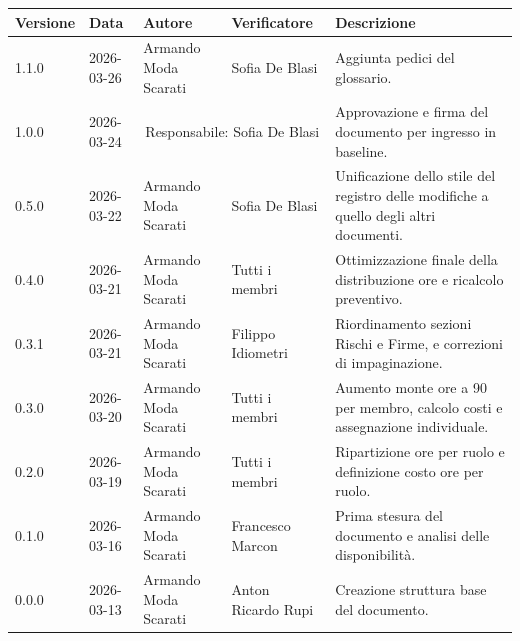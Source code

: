\documentclass[11pt, a4paper]{article}
\begin{document}
	\renewcommand{\arraystretch}{1.5}
	\begin{longtable}{>{\ttfamily\small}l l l l >{\raggedright\arraybackslash}p{5cm}}
		\toprule
		\textbf{Versione} & \textbf{Data} & \textbf{Autore} & \textbf{Verificatore} & \textbf{Descrizione} \\
		\midrule
		\endhead

		1.1.0 & 2026-03-26 & Armando Moda Scarati & Sofia De Blasi 
		& Aggiunta pedici del glossario. \\[4pt]
		
		1.0.0 & 2026-03-24 & \multicolumn{2}{c}{Responsabile: {Sofia De Blasi}} 
		& Approvazione e firma del documento per ingresso in baseline. \\[4pt]
		
		0.5.0 & 2026-03-22 & Armando Moda Scarati & Sofia De Blasi 
		& Unificazione dello stile del registro delle modifiche a quello degli altri documenti. \\[4pt]
		
		0.4.0 & 2026-03-21 & Armando Moda Scarati & Tutti i membri 
		& Ottimizzazione finale della distribuzione ore e ricalcolo preventivo. \\[4pt]
		
		0.3.1 & 2026-03-21 & Armando Moda Scarati & {Filippo Idiometri} 
		& Riordinamento sezioni Rischi e Firme, e correzioni di impaginazione. \\[4pt]
		
		0.3.0 & 2026-03-20 & Armando Moda Scarati & Tutti i membri 
		& Aumento monte ore a 90 per membro, calcolo costi e assegnazione individuale. \\[4pt]
		
		0.2.0 & 2026-03-19 & Armando Moda Scarati & Tutti i membri 
		& Ripartizione ore per ruolo e definizione costo ore per ruolo. \\[4pt]
		
		0.1.0 & 2026-03-16 & Armando Moda Scarati & {Francesco Marcon} 
		& Prima stesura del documento e analisi delle disponibilità. \\[4pt]
		
		0.0.0 & 2026-03-13 & Armando Moda Scarati & {Anton Ricardo Rupi} 
		& Creazione struttura base del documento. \\
		\bottomrule
	\end{longtable}
	
	\newpage
	
	\tableofcontents
	\newpage
	
\end{document}
